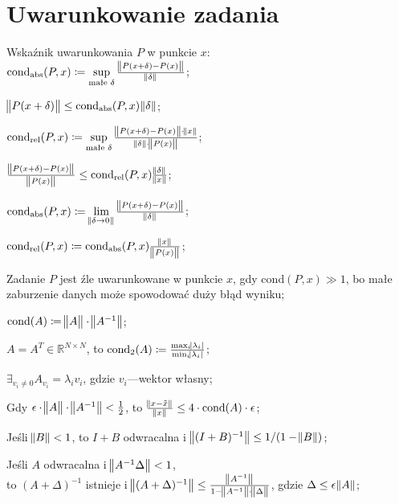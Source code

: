 \section{Uwarunkowanie zadania}

\entry
Wskaźnik uwarunkowania $P$ w punkcie $x$:\\ $\mathrm{cond}_{\mathrm{abs}}(P,x) \coloneqq \sup\limits_{\text{małe }\delta} \frac{\norm{P(x+\delta) - P(x)}}{\norm{\delta}}$;

\entry
$\norm{P(x+\delta)} \leq \mathrm{cond}_{\mathrm{abs}}(P,x)\norm{\delta}$;

\entry
$\mathrm{cond}_{\mathrm{rel}}(P,x) \coloneqq \sup\limits_{\text{małe }\delta} \frac{\norm{P(x+\delta) - P(x)} \cdot \norm{x}}{\norm{\delta} \cdot \norm{P(x)}}$;

\entry
$\frac{\norm{P(x+\delta) - P(x)}}{\norm{P(x)}} \leq \mathrm{cond}_{\mathrm{rel}}(P,x)\frac{\norm{\delta}}{\norm{x}}$;


\entry
$\mathrm{cond}_{\mathrm{abs}}(P,x) \coloneqq \lim\limits_{\norm{\delta \to 0}} \frac{\norm{P(x+\delta) - P(x)}}{\norm{\delta}}$;

\entry
$\mathrm{cond}_{\mathrm{rel}}(P,x) \coloneqq \mathrm{cond}_{\mathrm{abs}}(P,x)\frac{\norm{x}}{\norm{P(x)}} $;

\entry
Zadanie $P$ jest źle uwarunkowane w punkcie $x$, gdy $\mathrm{cond}(P,x) \gg 1$, bo małe zaburzenie danych może spowodować duży błąd wyniku;

\entry
$\mathrm{cond}(A) \coloneqq \norm{\vphantom{A^{-1}}A}\cdot\norm{A^{-1}}$;

\entry
$A=A^T\in\mathbb{R}^{N\times N}$, to $\mathrm{cond}_2(A)\coloneqq \frac{\max_i\abs{\lambda_i}}{\min_i\abs{\lambda_i}}$;

\entry
$\exists_{v_i\neq 0} A_{v_i} = \lambda_i v_i$, gdzie $v_i$---wektor własny;

\entry
Gdy $\epsilon\cdot\norm{\vphantom{A^1}A}\cdot\norm{A^{-1}} < \frac{1}{2}$, to $\frac{\norm{x - \tilde{x}}}{\norm{x}} \leq 4 \cdot \mathrm{cond}(A) \cdot \epsilon$;

\entry
Jeśli $\norm{B} < 1$, to $I+B$ odwracalna i $\norm{(I+B)^{-1}} \leq 1 / (1 - \norm{B})$;

\entry
Jeśli $A$ odwracalna i $\norm{A^{-1}\Delta} < 1$,\\ to $(A+\Delta)^{-1}$ istnieje i $\norm{(A+\Delta)^{-1}} \leq \frac{\norm{A^{-1}}}{1 - \norm{A^{-1}} \cdot \norm{\vphantom{A^1}\Delta}}$, gdzie $\Delta \leq \epsilon\norm{A}$;

